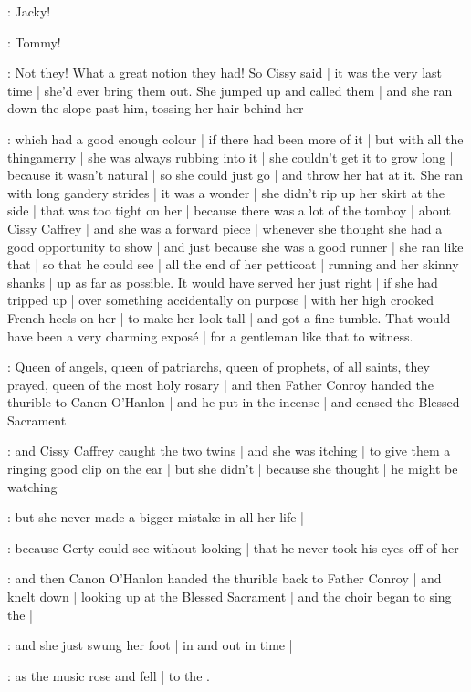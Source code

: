 \cissy:
Jacky!

\edy:
Tommy!

:
Not they!
What a great notion they had!
So Cissy said |
it was the very last time |
she'd ever bring them out.
She jumped up and called them |
and she ran down the slope past him,
tossing her hair behind her

\gertyJudgy:
which had a good enough colour |
if there had been more of it |
but with all the thingamerry |
she was always rubbing into it |
she couldn't get it to grow long |
because it wasn't natural |
so she could just go |
and throw her hat at it.
She ran with long gandery strides |
it was a wonder |
she didn't rip up her skirt at the side |
that was too tight on her |%
because there was a lot of the tomboy |
about Cissy Caffrey |
and she was a forward piece |
whenever she thought
she had a good opportunity to show |
and just because she was a good runner |
she ran like that |
so that he could see |
all the end of her petticoat |
running and her skinny shanks |
up as far as possible.
It would have served her just right |
if she had tripped up |
over something accidentally on purpose |
with her high crooked French heels on her |
to make her look tall |
and got a fine tumble.
That would have been
a very charming exposé |
for a gentleman like that
to witness.

\Nrelig:
Queen of angels,
queen of patriarchs,
queen of prophets,
of all saints,
they prayed,
queen of the most holy rosary |%
and then Father Conroy
handed the thurible
to Canon O'Hanlon |
and he put in the incense |
and censed the Blessed Sacrament

:
and Cissy Caffrey caught the two twins |
and she was itching |
to give them a ringing good clip on the ear |
but she didn't |
because she thought |
he might be watching

\gertyJudgy:
but she never made a bigger mistake in all her life |

\gertySex:
because Gerty could see without looking |
that he never took his eyes off of her

\Nrelig:
and then Canon O'Hanlon
handed the thurible
back to Father Conroy |
and knelt down |
looking up at the Blessed Sacrament |
and the choir
began to sing the  |

\gertySex:
and she just swung her foot |
in and out in time |

\Nrelig:
as the music rose and fell |
to the .


